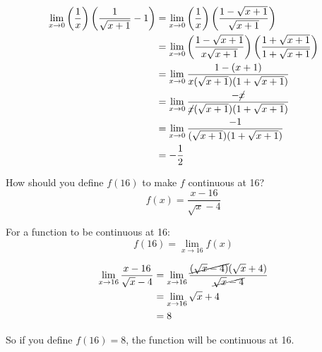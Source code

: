 \documentclass[fleqn,addpoints]{exam}
\begin{document}
\begin{questions}
\begin{solution}[5 cm]
\begin{align*}
  \lim_{x \to 0} \left( \frac{1}{x} \right) \left( \frac{1}{\sqrt{x + 1}} - 1 \right) 
      &= \lim_{x \to 0} \left( \frac{1}{x} \right) \left( \frac{1 - \sqrt{x + 1}}{\sqrt{x + 1}} \right) \\
      &= \lim_{x \to 0} \left( \frac{1 - \sqrt{x + 1}}{x \sqrt{x + 1}} \right) \left( \frac{1 + \sqrt{x + 1}}{1 + \sqrt{x + 1}} \right) \\
      &= \lim_{x \to 0} \frac{1 - (x + 1)}{x (\sqrt{x + 1})(1 + \sqrt{x+1})} \\
      &= \lim_{x \to 0} \frac{- \cancel{x}}{\cancel{x} (\sqrt{x + 1})(1 + \sqrt{x+1})} \\
      &= \lim_{x \to 0} \frac{-1}{(\sqrt{x + 1})(1 + \sqrt{x+1})} \\
      &= - \frac{1}{2} \\
\end{align*}
\end{solution}

\question[7]
How should you define $f(16)$ to make $f$ continuous at 16?
\[
  f(x) = \frac{x - 16}{\sqrt{x} - 4}
\]
\begin{solution}[4 cm]
For a function to be continuous at 16:
\[
  f(16) = \lim_{x \to 16} f(x)
\]

\begin{align*}
  \lim_{x \to 16} \frac{x - 16}{\sqrt{x} - 4} 
    &= \lim_{x \to 16} \frac{\cancel{(\sqrt{x} - 4)}(\sqrt{x} + 4)}{\cancel{\sqrt{x} - 4}} \\
    &= \lim_{x \to 16} \sqrt{x} + 4 \\
    &= 8 \\
\end{align*}

So if you define $f(16) = 8$, the function will be continuous at 16.

\end{solution}





\end{questions}
\end{document}
